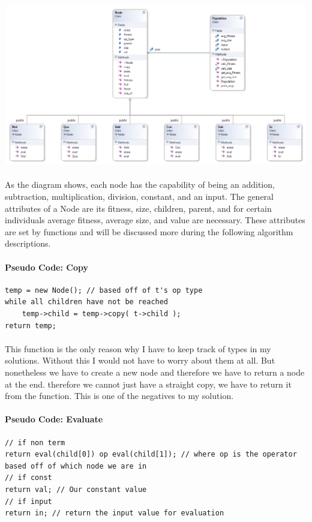 \documentclass[paper=a4, fontsize=11pt]{scrartcl} %
\numberwithin{equation}{section} %
\numberwithin{figure}{section} %
\numberwithin{table}{section} %
\begin{document}
\includegraphics[scale=.5]{ClassDiagram}

\paragraph{} As the diagram shows, each node has the capability of being an addition, subtraction, multiplication, division, constant, and an input. The general attributes of a Node are its fitness, size, children, parent, and for certain individuals average fitness, average size, and value are necessary. These attributes are set by functions and will be discussed more during the following algorithm descriptions.

\paragraph{Pseudo Code: Copy}
\begin{verbatim}
temp = new Node(); // based off of t's op type
while all children have not be reached
    temp->child = temp->copy( t->child );
return temp;
\end{verbatim}

\paragraph{} This function is the only reason why I have to keep track of types in my solutions. Without this I would not have to worry about them at all. But nonetheless we have to create a new node and therefore we have to return a node at the end. therefore we cannot just have a straight copy, we have to return it from the function. This is one of the negatives to my solution.

\paragraph{Pseudo Code: Evaluate}
\begin{verbatim}
// if non term
return eval(child[0]) op eval(child[1]); // where op is the operator based off of which node we are in
// if const
return val; // Our constant value
// if input
return in; // return the input value for evaluation
\end{verbatim}
\end{document}

